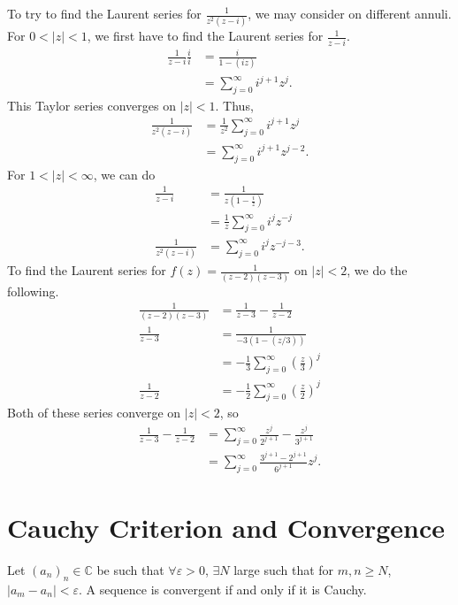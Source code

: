 \documentclass[10pt]{extarticle}
\newcommand{\C}{\mathbb{C}}
\begin{document}
  To try to find the Laurent series for $\frac{1}{z^2(z-i)}$, we may consider on different annuli. For $0 < |z| < 1$, we first have to find the Laurent series for $\frac{1}{z-i}$.
  \begin{align*}
    \frac{1}{z-i}\frac{i}{i} &= \frac{i}{1 - (iz)}\\
                             &= \sum_{j=0}^{\infty} i^{j+1}z^j.
  \end{align*}
  This Taylor series converges on $|z|<1$. Thus,
  \begin{align*}
    \frac{1}{z^2 (z-i)} &= \frac{1}{z^2}\sum_{j=0}^{\infty}i^{j+1} z^j\\
                        &= \sum_{j=0}^{\infty}i^{j+1}z^{j-2}.
  \end{align*}
  For $1 < |z| < \infty$, we can do
  \begin{align*}
    \frac{1}{z-i} &= \frac{1}{z\left(1-\frac{i}{z}\right)}\\
                  &= \frac{1}{z}\sum_{j=0}^{\infty}i^jz^{-j}\\
    \frac{1}{z^2(z-i)} &= \sum_{j=0}^{\infty}i^jz^{-j-3}.
  \end{align*}
  To find the Laurent series for $f(z) = \frac{1}{(z-2)(z-3)}$ on $|z| < 2$, we do the following.
  \begin{align*}
    \frac{1}{(z-2)(z-3)} &= \frac{1}{z-3} - \frac{1}{z-2}\\
           \frac{1}{z-3} &= \frac{1}{-3\left(1-(z/3)\right)}\\
                         &= -\frac{1}{3}\sum_{j=0}^{\infty}\left(\frac{z}{3}\right)^{j}\\
           \frac{1}{z-2} &= -\frac{1}{2}\sum_{j=0}^{\infty}\left(\frac{z}{2}\right)^j
  \end{align*}
  Both of these series converge on $|z|<2$, so
  \begin{align*}
    \frac{1}{z-3} - \frac{1}{z-2} &= \sum_{j=0}^{\infty}\frac{z^j}{2^{j+1}} - \frac{z^j}{3^{j+1}}\\
                                  &= \sum_{j=0}^{\infty} \frac{3^{j+1}-2^{j+1}}{6^{j+1}}z^j.
  \end{align*}
  \section{Cauchy Criterion and Convergence}%
  Let $(a_n)_n \in \C$ be such that $\forall \varepsilon > 0$, $\exists N$ large such that for $m,n\geq N$, $|a_m - a_n| < \varepsilon$. A sequence is convergent if and only if it is Cauchy.\\
\end{document}
